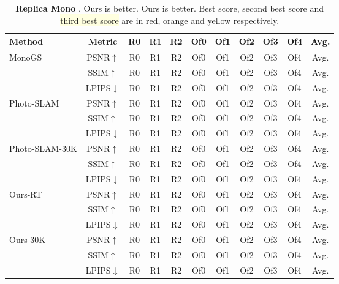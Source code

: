 \begin{table*}
  \centering
  \begin{tabular}{@{}l|cccccccccc@{}} %
    \toprule
    Method & Metric & R0 & R1 & R2 & Of0 & Of1 & Of2 & Of3 & Of4 & Avg.\\
    \midrule %
    \multirow{3}{*}{MonoGS} &  PSNR$\uparrow$   & R0 & R1 & R2 & Of0 & Of1 & Of2 & Of3 & Of4 & Avg. \\
    &SSIM$\uparrow$   & R0 & R1 & R2 & Of0 & Of1 & Of2 & Of3 & Of4 & Avg. \\
    &LPIPS$\downarrow$  & R0 & R1 & R2 & Of0 & Of1 & Of2 & Of3 & Of4 & Avg. \\
     \midrule
    \multirow{3}{*}{Photo-SLAM} &  PSNR$\uparrow$   & R0 & R1 & R2 & Of0 & Of1 & Of2 & Of3 & Of4 & Avg. \\
    &SSIM$\uparrow$   & R0 & R1 & R2 & Of0 & Of1 & Of2 & Of3 & Of4 & Avg. \\
    &LPIPS$\downarrow$  & R0 & R1 & R2 & Of0 & Of1 & Of2 & Of3 & Of4 & Avg. \\
     \midrule
    \multirow{3}{*}{Photo-SLAM-30K} &  PSNR$\uparrow$   & R0 & R1 & R2 & Of0 & Of1 & Of2 & Of3 & Of4 & Avg. \\
    &SSIM$\uparrow$   & R0 & R1 & R2 & Of0 & Of1 & Of2 & Of3 & Of4 & Avg. \\
    &LPIPS$\downarrow$  & R0 & R1 & R2 & Of0 & Of1 & Of2 & Of3 & Of4 & Avg. \\
     \midrule
    \multirow{3}{*}{Ours-RT} &  PSNR$\uparrow$   & R0 & R1 & R2 & Of0 & Of1 & Of2 & Of3 & Of4 & Avg. \\
    &SSIM$\uparrow$   & R0 & R1 & R2 & Of0 & Of1 & Of2 & Of3 & Of4 & Avg. \\
    &LPIPS$\downarrow$  & R0 & R1 & R2 & Of0 & Of1 & Of2 & Of3 & Of4 & Avg. \\
     \midrule
    \multirow{3}{*}{Ours-30K} &  PSNR$\uparrow$   & R0 & R1 & R2 & Of0 & Of1 & Of2 & Of3 & Of4 & Avg. \\
    &SSIM$\uparrow$   & R0 & R1 & R2 & Of0 & Of1 & Of2 & Of3 & Of4 & Avg. \\
    &LPIPS$\downarrow$  & R0 & R1 & R2 & Of0 & Of1 & Of2 & Of3 & Of4 & Avg. \\
    \bottomrule
  \end{tabular}
  \caption{{\bf Replica Mono} . Ours is better. Ours is better. \colorbox{lightred}{Best score}, \colorbox{lightorange}{second best score} and \colorbox{lightyellow}{third best score} are in red, orange and yellow respectively.}
  \label{tab:example}
\end{table*}

